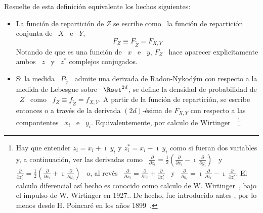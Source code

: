 Resuelte de esta definici\'on equivalente los hechos siguientes:
%
\begin{itemize}
\item La  funci\'on de repartici\'on  de $Z$ se  escribe como \ la  funci\'on de
  repartici\'on conjunta de \ $X$ \ e \ $Y$,
  \[
  F_Z \equiv F_{\widetilde{Z}} = F_{X,Y}
  \]
  Notando de  que es una  funci\'on de \  $x$ \ e \  $y$, $F_Z$ \  hace aparecer
  explicitamente ambos \ $z$ \ y \ $z^*$ complejos conjugados.
%
\item   Si  la   medida  \   $P_{\widetilde{Z}}$  \   admite  una   derivada  de
  Radon-Nykod\'ym con respecto a la medida  de Lebesgue sobre \ $\Rset^{2 d}$, se
  define  la  densidad   de  probabilidad  de  \  $Z$  \   como  \  $f_Z  \equiv
  f_{\widetilde{Z}} =  f_{X,Y}$. A partir  de la funci\'on de  repartici\'on, se
  escribe entonces o a trav\'es de  la derivada $(2 d)$-\'esima de $F_{X,Y}$ con
  respecto a las compontentes \ $x_i$  \ e \ $y_i$. Equivalentemente, por calculo
  de  Wirtinger~\cite{Rem91}~\footnote{Hay que entender  $z_i =  x_i +  \imath \
    y_i$  y $z_i^* =  x_i -  \imath \  y_i$ como  si fueran  dos variables  y, a
    continuaci\'on, ver  las derivadas  como \ $\frac{\partial}{\partial  z_i} =
    \frac12    \left(     \frac{\partial}{\partial    x_i}    -     \imath    \,
      \frac{\partial}{\partial  y_i} \right)$  \  y \  $\frac{\partial}{\partial
      z_i^*}  =  \frac12  \left(   \frac{\partial}{\partial  x_i}  +  \imath  \,
      \frac{\partial}{\partial    y_i}   \right)$    \   o,    al    rev\'es   \
    $\frac{\partial}{\partial    x_i}   =   \frac{\partial}{\partial    z_i}   +
    \frac{\partial}{\partial  z_i^*}$  \ y  \  $\frac{\partial}{\partial y_i}  =
    \imath \, \frac{\partial}{\partial z_i} - \imath \, \frac{\partial}{\partial
      z_i^*}$.
    El  calculo  diferencial  as\'i  hecho   es  conocido  como  calculo  de  W.
    Wirtinger~\cite{Rem91, Wir27}, bajo el impulso de W. Wirtinger en 1927..
    De hecho,  fue introducido antes , por  lo menos desde H.  Poincar\'e en los
    a\~nos 1899~\cite{Poi99}.\label{Foot:MP:Wirtinger}
}

\end{itemize}
